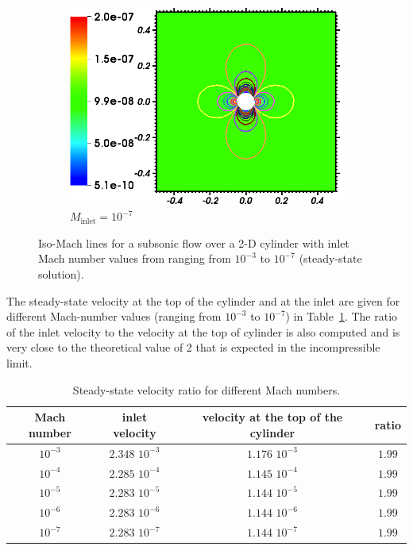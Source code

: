 \documentclass[review,10pt]{elsarticle}
\newcommand{\tbl}[1]{Table~\ref{#1}}                     %
\begin{document}
\begin{figure}[H]
        \begin{subfigure}[b]{0.495\textwidth}
                \centering
                \includegraphics[width=\textwidth]{figures/CylinderMach1em7ZoomIn.png}
                \caption{$M_{\text{inlet}}=10^{-7}$}
                \label{fig:cyl_1em7}
        \end{subfigure}
        \caption{Iso-Mach lines for a subsonic flow over a 2-D cylinder with inlet Mach number values 
				from ranging from $10^{-3}$ to $10^{-7}$ (steady-state solution).}
				\label{fig:cylinder}
\end{figure}
%
The steady-state velocity at the top of the cylinder and at the inlet are given for different Mach-number values 
(ranging from $10^{-3}$ to $10^{-7}$) in \tbl{tbl:velocity_ratio}. The ratio of the inlet velocity to 
the velocity at the top of cylinder is also computed and is very close to the theoretical value of 2 
that is expected in the incompressible limit.
%
\begin{table}[H]
\begin{center}
 \caption{\label{tbl:velocity_ratio}Steady-state velocity ratio for different Mach numbers.}
\begin{tabular}{|c|c|c|c|}
\hline
Mach number & inlet velocity & velocity at the top of the cylinder & ratio \\ \hline
$10^{-3}$ & $2.348$ $10^{-3}$ & $1.176$ $10^{-3}$& $1.99$  \\ \hline
$10^{-4}$ & $2.285$ $10^{-4}$ & $1.145$ $10^{-4}$& $1.99$  \\ \hline
$10^{-5}$ & $2.283$ $10^{-5}$ & $1.144$ $10^{-5}$ & $1.99$ \\ \hline
$10^{-6}$ & $2.283$ $10^{-6}$ & $1.144$ $10^{-6}$ & $1.99$ \\ \hline
$10^{-7}$ & $2.283$ $10^{-7}$ & $1.144$ $10^{-7}$ & $1.99$ \\ \hline 
\end{tabular}
\end{center}
\nonumber
\end{table}
\end{document}
